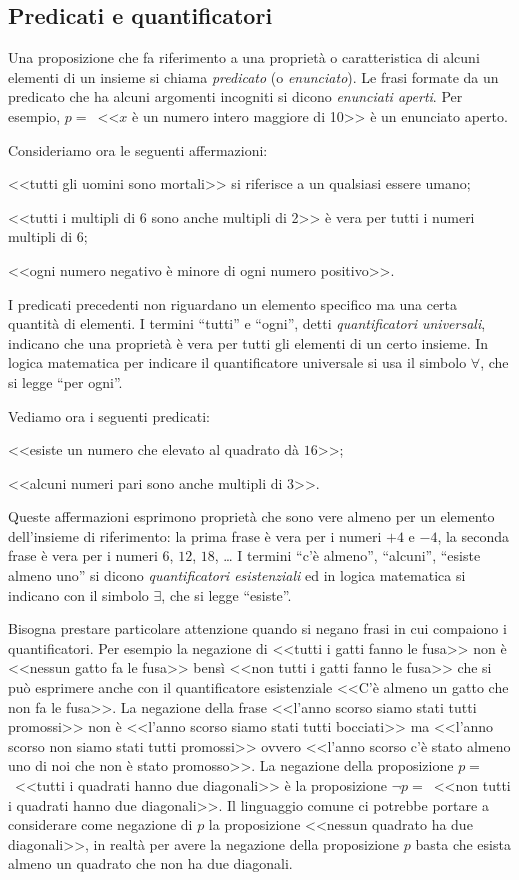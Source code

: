 \subsection{Predicati e quantificatori}

Una proposizione che fa riferimento a una proprietà o caratteristica di alcuni elementi di un insieme si chiama \emph{predicato} (o \emph{enunciato}). Le frasi formate da un predicato che ha alcuni argomenti incogniti si dicono \emph{enunciati aperti}.
Per esempio, $p=$~<<$x$ è un numero intero maggiore di 10>> è un enunciato aperto.

Consideriamo ora le seguenti affermazioni:
\begin{itemize*}
\item <<tutti gli uomini sono mortali>> si riferisce a un qualsiasi essere umano;
\item <<tutti i multipli di 6 sono anche multipli di 2>> è vera per tutti i numeri multipli di 6;
\item <<ogni numero negativo è minore di ogni numero positivo>>.
\end{itemize*}
I predicati precedenti non riguardano un elemento specifico ma una certa quantità di elementi. I termini ``tutti'' e ``ogni'', detti \emph{quantificatori universali}, indicano che una proprietà è vera per tutti gli elementi di un certo insieme. In logica matematica per indicare il quantificatore universale si usa il simbolo $\forall$, che si legge ``per ogni''.

Vediamo ora i seguenti predicati:
\begin{itemize*}
\item <<esiste un numero che elevato al quadrato dà $16$>>;
\item <<alcuni numeri pari sono anche multipli di $3$>>.
\end{itemize*}
Queste affermazioni esprimono proprietà che sono vere almeno per un elemento dell'insieme di riferimento: la prima frase è vera per i numeri $+4$ e $-4$, la seconda frase è vera per i numeri $6$, $12$, $18$, \ldots{}
I termini ``c'è almeno'', ``alcuni'', ``esiste almeno uno'' si dicono \emph{quantificatori esistenziali} ed in logica matematica si indicano con il simbolo $\exists$, che si legge ``esiste''.

Bisogna prestare particolare attenzione quando si negano frasi in cui compaiono i quantificatori. Per esempio la negazione di <<tutti i gatti fanno le fusa>> non è <<nessun gatto fa le fusa>> bensì <<non tutti i gatti fanno le fusa>> che si può esprimere anche con il quantificatore esistenziale <<C'è almeno un gatto che non fa le fusa>>.
La negazione della frase <<l'anno scorso siamo stati tutti promossi>> non è <<l'anno scorso siamo stati tutti bocciati>> ma <<l'anno scorso non siamo stati tutti promossi>> ovvero <<l'anno scorso c'è stato almeno uno di noi che non è stato promosso>>.
La negazione della proposizione $p=$~<<tutti i quadrati hanno due diagonali>> è la proposizione ${\lnot}p=$~<<non tutti i quadrati hanno due diagonali>>.
Il linguaggio comune ci potrebbe portare a considerare come negazione di $p$ la proposizione <<nessun quadrato ha due diagonali>>, in realtà per avere la negazione della proposizione $p$ basta che esista almeno un quadrato che non ha due diagonali.

